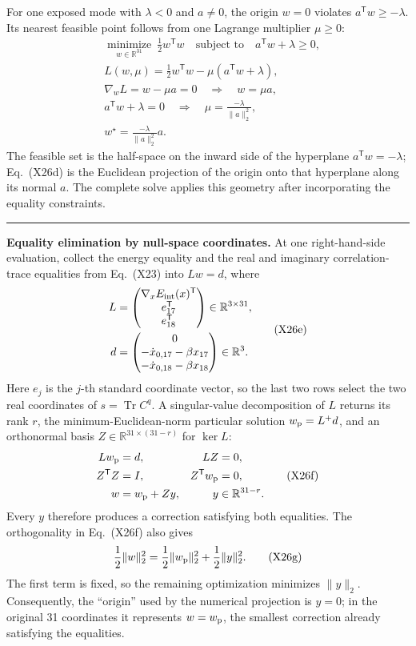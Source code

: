 \documentclass[10pt,letterpaper,twocolumn]{article}
\newcommand{\R}{\mathbb R}
\newcommand{\conceptbreak}{%
  \par\medskip\noindent
  {\color{black!30}\rule{\columnwidth}{0.35pt}}%
  \par\medskip
}
\begin{document}
For one exposed mode with \(\lambda<0\) and \(a\neq0\), the origin
\(w=0\) violates \(a^{\mathsf T}w\geq-\lambda\).  Its nearest feasible point
follows from one Lagrange multiplier \(\mu\geq0\):
{\footnotesize
\[
\begin{aligned}
&\underset{w\in\R^{31}}{\operatorname{minimize}}
\ \frac12w^{\mathsf T}w
\quad\text{subject to}\quad a^{\mathsf T}w+\lambda\geq0,\\
&L(w,\mu)=\frac12w^{\mathsf T}w
-\mu(a^{\mathsf T}w+\lambda),\\
&\nabla_wL=w-\mu a=0
\quad\Longrightarrow\quad w=\mu a,\\
&a^{\mathsf T}w+\lambda=0
\quad\Longrightarrow\quad
\mu=\frac{-\lambda}{\lVert a\rVert_2^2},\\
&\boxed{w^\star=\frac{-\lambda}{\lVert a\rVert_2^2}a.}
\end{aligned}
\tag{X26d}
\]
}
The feasible set is the half-space on the inward side of the hyperplane
\(a^{\mathsf T}w=-\lambda\); Eq.~(X26d) is the Euclidean projection of the
origin onto that hyperplane along its normal \(a\).  The complete solve applies
this geometry after incorporating the equality constraints.

\conceptbreak
\textbf{Equality elimination by null-space coordinates.}
At one right-hand-side evaluation, collect the energy equality and the real
and imaginary correlation-trace equalities from Eq.~(X23) into
\(Lw=d\), where
{\footnotesize
\[
\begin{aligned}
L&=
\begin{pmatrix}
\nabla_xE_{\rm int}(x)^{\mathsf T}\\
e_{17}^{\mathsf T}\\
e_{18}^{\mathsf T}
\end{pmatrix}
\in\R^{3\times31},\\
d&=
\begin{pmatrix}
0\\
-\dot x_{0,17}-\beta x_{17}\\
-\dot x_{0,18}-\beta x_{18}
\end{pmatrix}
\in\R^3.
\end{aligned}
\tag{X26e}
\]
}
Here \(e_j\) is the \(j\)-th standard coordinate vector, so the last two rows
select the two real coordinates of \(s=\operatorname{Tr}C^q\).  A singular-value
decomposition of \(L\) returns its rank \(r\), the minimum-Euclidean-norm
particular solution \(w_{\rm p}=L^+d\), and an orthonormal basis
\(Z\in\R^{31\times(31-r)}\) for \(\ker L\):
\[
\begin{aligned}
Lw_{\rm p}&=d,&LZ&=0,\\
Z^{\mathsf T}Z&=I,&Z^{\mathsf T}w_{\rm p}&=0,\\
w&=w_{\rm p}+Zy,&y&\in\R^{31-r}.
\end{aligned}
\tag{X26f}
\]
Every \(y\) therefore produces a correction satisfying both equalities.  The
orthogonality in Eq.~(X26f) also gives
\[
\frac12\lVert w\rVert_2^2
=\frac12\lVert w_{\rm p}\rVert_2^2
+\frac12\lVert y\rVert_2^2.
\tag{X26g}
\]
The first term is fixed, so the remaining optimization minimizes
\(\lVert y\rVert_2\).  Consequently, the ``origin'' used by the numerical
projection is \(y=0\); in the original 31 coordinates it represents
\(w=w_{\rm p}\), the smallest correction already satisfying the equalities.
\end{document}
